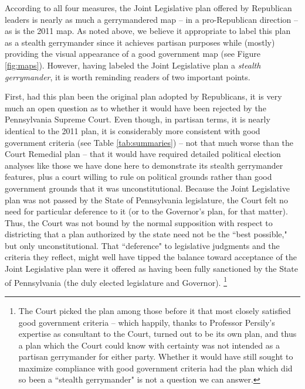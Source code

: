 \par
    According to all four measures, the Joint Legislative plan offered by Republican leaders is nearly as much a gerrymandered map -- in a pro-Republican direction -- as is the 2011 map. As noted above, we believe it appropriate to label this plan as a stealth gerrymander since it achieves partisan purposes while (mostly) providing the visual appearance of a good government map (see Figure \ref{fig:maps}). However, having labeled the Joint Legislative plan a \textit{stealth gerrymander}, it is worth reminding readers of two important points. 
\par
    First, had this plan been the original plan adopted by Republicans, it is very much an open question as to whether it would have been rejected by the Pennsylvania Supreme Court. Even though, in partisan terms, it is nearly identical to the 2011 plan, it is considerably more consistent with good government criteria (see Table \ref{tab:summaries}) -- not that much worse than the Court Remedial plan -- that it would have required detailed political election analyses like those we have done here to demonstrate its stealth gerrymander features, plus a court willing to rule on political grounds rather than good government grounds that it was unconstitutional. Because the Joint Legislative plan was not passed by the State of Pennsylvania legislature, the Court felt no need for particular deference to it (or to the Governor's plan, for that matter). Thus, the Court was not bound by the normal supposition with respect to districting that a plan authorized by the state need not be the ``best possible," but only unconstitutional. That ``deference" to legislative judgments and the criteria they reflect, might well have tipped the balance toward acceptance of the Joint Legislative plan were it offered as having been fully sanctioned by the State of Pennsylvania (the duly elected legislature and Governor). 
    \footnote{The Court picked the plan among those before it that most closely satisfied good government criteria -- which happily, thanks to Professor Persily's expertise as consultant to the Court, turned out to be its own plan, and thus a plan which the Court could know with certainty was not intended as a partisan gerrymander for either party. Whether it would have still sought to maximize compliance with good government criteria had the plan which did so been a ``stealth gerrymander" is not a question we can answer.}       
